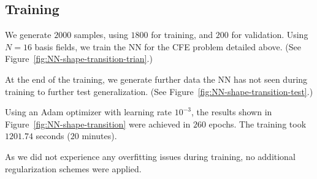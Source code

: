 \subsection*{Training}
We generate $2000$ samples, using $1800$ for training, and $200$ for validation.
Using $N=16$ basis fields, we train the \ac{NN} for the \ac{CFE} problem
detailed above. (See Figure~\ref{fig:NN-shape-transition-trian}.)

At the end of the training, we generate further data the \ac{NN} has not seen
during training to further test generalization.
(See Figure~\ref{fig:NN-shape-transition-test}.)

Using an Adam \cite{adam} optimizer with learning rate $10^{-3}$, the results
shown in Figure~\ref{fig:NN-shape-transition} were achieved in $260$ epochs. The
training took $1201.74$ seconds ($20$ minutes).

As we did not experience any overfitting issues during training, no additional
regularization schemes were applied. 

